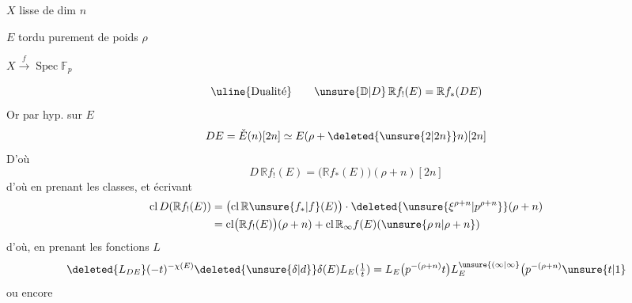 $X$ lisse  de dim $n$

$E$  tordu purement de poids $\rho$

$X\xrightarrow{f}\operatorname{Spec}\mathbb F_p$ 

\[
\text{\uline{Dualité}}\qquad \unsure{\mathbb D|D}\,\mathbb R f_!(E)=\mathbb R f_*(DE)
\]
Or par hyp. sur $E$
\[
DE=\check E(n)[2n]\simeq E(\rho+\deleted{\unsure{2|2n}}n)[2n]
\]
D'où
\[
D\,\mathbb R f_!(E)=\bigl(\mathbb R f_*(E)\bigr)(\rho+n)[2n]
\]
d'où en prenant les classes, et écrivant
\[
\begin{aligned}
\operatorname{cl}D(\mathbb R f_!(E))&=\bigl(\operatorname{cl}\mathbb R \unsure{f_*|f}(E)\bigr)\cdot\deleted{\unsure{\xi^{\rho+n}|p^{\rho+n}}}(\rho+n)\\
&=\operatorname{cl}\bigl(\mathbb R f_!(E)\bigr)(\rho+n)+\operatorname{cl}\mathbb R_\infty f(E)(\unsure{\rho\,n|\rho+n})
\end{aligned}
\]
d'où, en prenant les fonctions $L$
\[
\deleted{L_{DE}}(-t)^{-\chi(E)}\deleted{\unsure{\delta|d}}\delta(E)L_E(\tfrac{1}{t})=L_E\bigl(p^{-(\rho+n)}t\bigr)L_E^{\unsure{(\infty|\infty}}\bigl(p^{-(\rho+n)}\unsure{t|1}
\]
ou encore
